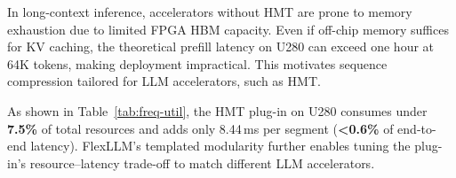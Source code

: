 \documentclass[conference]{IEEEtran}
\begin{document}




In long-context inference, accelerators without HMT are prone to memory exhaustion due to limited FPGA HBM capacity. Even if off-chip memory suffices for KV caching, the theoretical prefill latency on U280 can exceed one hour at 64K tokens, making deployment impractical. This motivates sequence compression tailored for LLM accelerators, such as HMT.

As shown in Table~\ref{tab:freq-util}, the HMT plug-in on U280 consumes under \textbf{7.5\%} of total resources and adds only 8.44\,ms per segment (\textbf{\textless0.6\%} of end-to-end latency). FlexLLM’s templated modularity further enables tuning the plug-in’s resource--latency trade-off to match different LLM accelerators.
\end{document}
